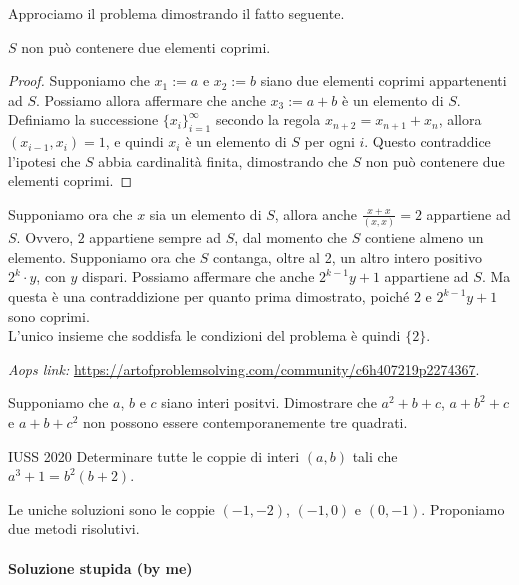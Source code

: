 \documentclass{article}
\begin{document}
Approciamo il problema dimostrando il fatto seguente.

\begin{claim*}{}{}
	$S$ non può contenere due elementi coprimi.
\end{claim*}
\begin{proof}
	Supponiamo che $x_1:=a$ e $x_2:=b$
	siano due elementi coprimi appartenenti ad $S$.
	Possiamo allora affermare che anche $x_3:=a+b$ è un elemento di $S$.
	Definiamo la successione
	$\{ x_i \}_{i=1}^{\infty}$ secondo la regola $x_{n+2}=x_{n+1}+x_n$,
	allora $(x_{i-1},x_{i})=1$, e quindi $x_i$ è un elemento di $S$
	per ogni $i$. Questo contraddice l'ipotesi che $S$ abbia cardinalità
	finita, dimostrando che $S$ non può contenere due elementi coprimi.
\end{proof}

Supponiamo ora che $x$ sia un elemento di $S$, allora anche
$\frac{x+x}{(x,x)}=2$ appartiene ad $S$. Ovvero, $2$ appartiene
sempre ad $S$, dal momento che $S$ contiene almeno un elemento.
Supponiamo ora che $S$ contanga, oltre al 2, un altro intero positivo
$2^k\cdot y$, con $y$ dispari. Possiamo affermare che anche
$2^{k-1}y+1$ appartiene ad $S$. Ma questa è una contraddizione
per quanto prima dimostrato,
poiché $2$ e $2^{k-1}y+1$ sono coprimi.\\
L'unico insieme che soddisfa le condizioni del problema
è quindi $\{ 2\}$.

\vspace{0.5cm}
\textit{Aops link:}
\href{https://artofproblemsolving.com/community/c6h407219p2274367}
{https://artofproblemsolving.com/community/c6h407219p2274367}.

\begin{proposition}{}{}
	Supponiamo che $a$, $b$ e $c$ siano interi positvi. Dimostrare che
	$a^2+b+c$, $a+b^2+c$ e $a+b+c^2$ non possono essere contemporanemente
	tre quadrati.
\end{proposition}


\begin{proposition}{IUSS 2020}{}
	Determinare tutte le coppie di interi $(a,b)$ tali che $a^3+1=b^2(b+2)$.
\end{proposition}

Le uniche soluzioni sono le coppie $(-1,-2)$, $(-1,0)$ e $(0,-1)$.
Proponiamo due metodi risolutivi.

\paragraph{Soluzione stupida (by me)}
\end{document}
